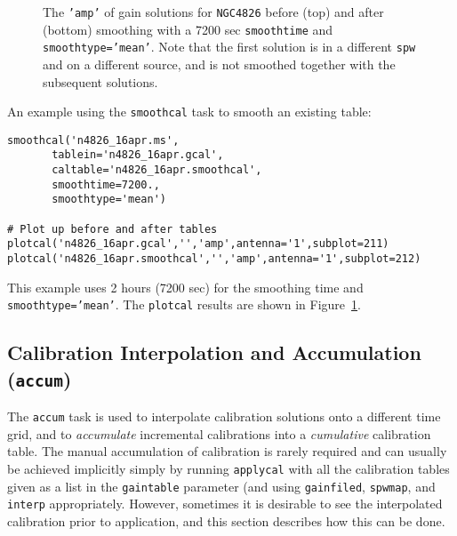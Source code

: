 {\begin{figure}[h!]
\begin{center}
\caption{\label{fig:smoothcal_4826} The {\tt 'amp'} of gain solutions
for {\tt NGC4826} before (top) and after (bottom) smoothing with
a 7200 sec {\tt smoothtime} and {\tt smoothtype='mean'}.  Note that
the first solution is in a different {\tt spw} and on a different
source, and is not smoothed together with the subsequent solutions.}
\hrulefill
\end{center}
\end{figure}

An example using the {\tt smoothcal} task to smooth an existing table:
\small
\begin{verbatim}
smoothcal('n4826_16apr.ms',
       tablein='n4826_16apr.gcal',
       caltable='n4826_16apr.smoothcal',
       smoothtime=7200.,
       smoothtype='mean')

# Plot up before and after tables
plotcal('n4826_16apr.gcal','','amp',antenna='1',subplot=211)
plotcal('n4826_16apr.smoothcal','','amp',antenna='1',subplot=212)
\end{verbatim}
\normalsize
This example uses 2 hours (7200 sec) for the smoothing time and
{\tt smoothtype='mean'}.  The {\tt plotcal} results are shown
in Figure~\ref{fig:smoothcal_4826}.


\subsection{Calibration Interpolation and Accumulation ({\tt accum})}
\label{section:cal.tables.accum}

The {\tt accum} task is used to interpolate calibration solutions onto
a different time grid, and to {\it accumulate} incremental
calibrations into a {\it cumulative} calibration table.  The manual
accumulation of calibration is rarely required and can usually be
achieved implicitly simply by running {\tt applycal} with all the
calibration tables given as a list in the {\tt gaintable} parameter
(and using {\tt gainfiled}, {\tt spwmap}, and {\tt interp}
appropriately.  However, sometimes it is desirable to see the
interpolated calibration prior to application, and this section
describes how this can be done.

}
